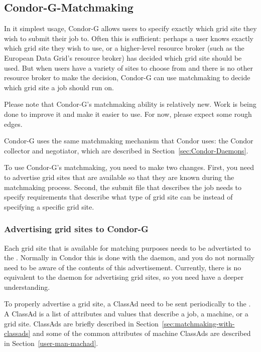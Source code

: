 \subsection{\label{sec:Condor-G-Matchmaking}Condor-G-Matchmaking}

In it simplest usage, Condor-G allows users to specify exactly which
grid site they wish to submit their job to. Often this is
sufficient: perhaps a user knows exactly which grid site they wish to
use, or a higher-level resource broker (such as the European Data
Grid's resource broker) has decided which grid site should be
used. But when users have a variety of sites to choose from and there
is no other resource broker to make the decision, Condor-G can use
matchmaking to decide which grid site a job should run on. 

Please note that Condor-G's matchmaking ability is relatively
new. Work is being done to improve it and make it easier to use. For
now, please expect some rough edges. 

Condor-G uses the same matchmaking mechanism that Condor uses: the
Condor collector and negotiator, which are described in
Section~\ref{sec:Condor-Daemons}. 

To use Condor-G's matchmaking, you need to make two changes. First,
you need to advertise grid sites that are available so that they are
known during the matchmaking process. Second, the submit file that
describes the job needs to specify requirements that describe what
type of grid site can be instead of specifying a specific grid site.

\subsubsection{Advertising grid sites to Condor-G}

Each grid site that is available for matching purposes needs to be
advertisted to the . Normally in Condor this is done
with the  daemon, and you do not normally need to be
aware of the contents of this advertisement. Currently, there is no
equivalent to the  daemon for advertising grid sites,
so you need have a deeper understanding. 

To properly advertise a grid site, a ClassAd need to be sent
periodically to the . A ClassAd is a list of
attributes and values that describe a job, a machine, or a grid
site. ClassAds are briefly described in
Section~\ref{sec:matchmaking-with-classads} and some of the common
attributes of machine ClassAds are described in
Section~\ref{user-man-machad}.

